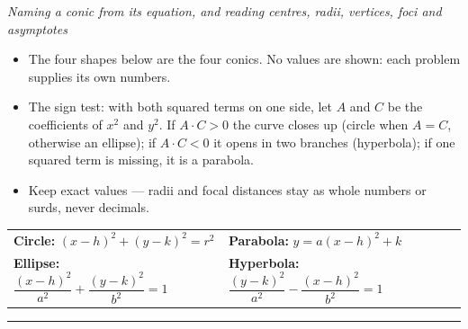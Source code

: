 \documentclass[12pt]{article}
\begin{document}

\begin{center}
\small\textit{Naming a conic from its equation, and reading centres, radii, vertices, foci and asymptotes}
\end{center}

\begin{itemize}[leftmargin=0.7cm, itemsep=1pt, topsep=2pt]
  \item The four shapes below are the four conics. No values are shown: each problem supplies its own numbers.
  \item The sign test: with both squared terms on one side, let $A$ and $C$ be the coefficients of $x^2$ and $y^2$. If $A\cdot C > 0$ the curve closes up (circle when $A = C$, otherwise an ellipse); if $A \cdot C < 0$ it opens in two branches (hyperbola); if one squared term is missing, it is a parabola.
  \item Keep exact values --- radii and focal distances stay as whole numbers or surds, never decimals.
\end{itemize}

\begin{center}

\vspace{0.1cm}
\begin{tabular}{@{}l@{\quad}l@{}}
\textbf{Circle:} $(x-h)^2 + (y-k)^2 = r^2$ &
\textbf{Parabola:} $y = a(x-h)^2 + k$ \\[2pt]
\textbf{Ellipse:} $\dfrac{(x-h)^2}{a^2} + \dfrac{(y-k)^2}{b^2} = 1$ &
\textbf{Hyperbola:} $\dfrac{(y-k)^2}{a^2} - \dfrac{(x-h)^2}{b^2} = 1$ \\
\end{tabular}
\end{center}

\vspace{0.1cm}
\noindent\rule{\linewidth}{0.4pt}
\end{document}
